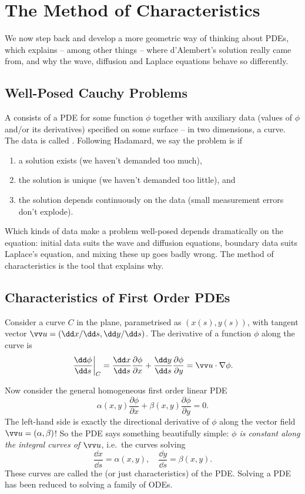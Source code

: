 \section{The Method of Characteristics}

We now step back and develop a more geometric way of thinking about PDEs, which explains -- among other things -- where d'Alembert's solution really came from, and why the wave, diffusion and Laplace equations behave so differently.

\subsection{Well-Posed Cauchy Problems}

A  consists of a PDE for some function $\phi$ together with auxiliary data (values of $\phi$ and/or its derivatives) specified on some surface -- in two dimensions, a curve. The data is called .
Following Hadamard, we say the problem is  if
\begin{enumerate}[label=(\roman*)]
    \item a solution exists (we haven't demanded too much),
    \item the solution is unique (we haven't demanded too little), and
    \item the solution depends continuously on the data (small measurement errors don't explode).
\end{enumerate}
Which kinds of data make a problem well-posed depends dramatically on the equation: initial data suits the wave and diffusion equations, boundary data suits Laplace's equation, and mixing these up goes badly wrong. The method of characteristics is the tool that explains why.

\subsection{Characteristics of First Order PDEs}

Consider a curve $C$ in the plane, parametrised as $(x(s), y(s))$, with tangent vector $\vv u = (\dd x/\dd s, \dd y/\dd s)$. The derivative of a function $\phi$ along the curve is
$$
\left.\frac{\dd \phi}{\dd s}\right|_C = \frac{\dd x}{\dd s} \frac{\partial \phi}{\partial x} + \frac{\dd y}{\dd s}\frac{\partial \phi}{\partial y} = \vv u \cdot \nabla \phi.
$$

Now consider the general homogeneous first order linear PDE
$$
\alpha(x, y) \frac{\partial \phi}{\partial x} + \beta(x, y) \frac{\partial \phi}{\partial y} = 0.
$$
The left-hand side is exactly the directional derivative of $\phi$ along the vector field $\vv u = (\alpha, \beta)$! So the PDE says something beautifully simple: \emph{$\phi$ is constant along the integral curves of $\vv u$}, i.e.\ the curves solving
$$
\frac{\dd x}{\dd s} = \alpha(x, y), \quad \frac{\dd y}{\dd s} = \beta(x, y).
$$
These curves are called the  (or just characteristics) of the PDE. Solving a PDE has been reduced to solving a family of ODEs.

